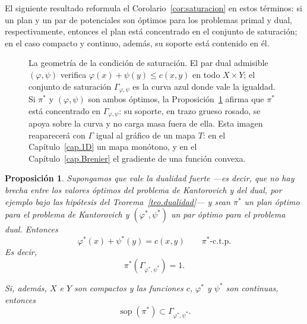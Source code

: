 \documentclass[12pt, a4paper]{amsbook}
\def\sop{\operatorname {\mathrm{sop}}}
\newtheorem{prop}[teo]{Proposición}
\theoremstyle{remark}
\theoremstyle{definition}
\numberwithin{section}{chapter}
\numberwithin{subsection}{section}
\numberwithin{equation}{section}
\numberwithin{figure}{chapter}
\begin{document}
El siguiente resultado reformula el Corolario~\ref{cor:saturacion} en estos
términos: si un plan y un par de potenciales son óptimos para los problemas
primal y dual, respectivamente, entonces el plan está concentrado en el
conjunto de saturación; en el caso compacto y continuo, además, su soporte
está contenido en él.

 

\begin{figure}[ht]
\centering
{}
\caption{La geometría de la condición de saturación. El par dual admisible
$(\varphi,\psi)$ verifica $\varphi(x)+\psi(y)\le c(x,y)$ en todo $X\times Y$;
el conjunto de saturación $\Gamma_{\varphi,\psi}$ es la curva azul donde vale la
igualdad. Si $\pi^*$ y $(\varphi,\psi)$ son ambos óptimos, la
Proposición~\ref{prop.soporte} afirma que $\pi^*$ está concentrado en
$\Gamma_{\varphi,\psi}$: su soporte, en trazo grueso rosado, se apoya sobre la
curva y no
carga masa fuera de ella. Esta imagen reaparecerá con $\Gamma$ igual al
gráfico de un mapa $T$: en el Capítulo~\ref{cap.1D} un mapa monótono, y en el
Capítulo~\ref{cap.Brenier} el gradiente de una función convexa.}
\label{fig.saturacion}
\end{figure}
 

\begin{prop}\label{prop.soporte}
Supongamos que vale la dualidad fuerte —es decir, que no hay brecha entre los
valores óptimos del problema de Kantorovich y del dual, por ejemplo bajo las
hipótesis del Teorema~\ref{teo.dualidad}— y sean $\pi^*$ un plan óptimo para
el problema de Kantorovich y $(\varphi^*,\psi^*)$ un par óptimo para el
problema dual. Entonces
\[
\varphi^*(x)+\psi^*(y)=c(x,y)
\qquad
\pi^*\text{-c.t.p.}
\]
Es decir,
\[
\pi^*(\Gamma_{\varphi^*,\psi^*})=1.
\]

Si, además, $X$ e $Y$ son compactos y las funciones $c$, $\varphi^*$ y
$\psi^*$ son continuas, entonces
\[
\operatorname{sop}(\pi^*)
\subset
\Gamma_{\varphi^*,\psi^*}.
\]
\end{prop}
\end{document}
